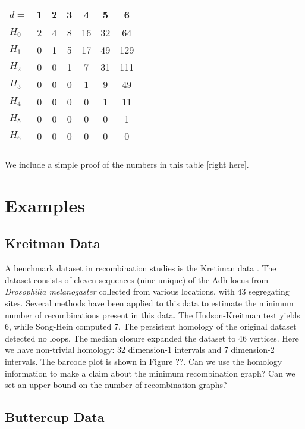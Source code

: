 \begin{center}
\begin{tabular}{lcccccc}
$d=$    & 1 & 2 & 3 &  4 &  5 & 6\\
\toprule
$H_{0}$ & 2 & 4 & 8 & 16 & 32 & 64\\
\midrule
$H_{1}$ & 0 & 1 & 5 & 17 & 49 & 129\\
\midrule
$H_{2}$ & 0 & 0 & 1 &  7 & 31 & 111\\
\midrule
$H_{3}$ & 0 & 0 & 0 &  1 &  9 & 49\\
\midrule
$H_{4}$ & 0 & 0 & 0 & 0 &  1 & 11\\
\midrule
$H_{5}$ & 0 & 0 & 0 & 0 &  0 &  1\\
\midrule
$H_{6}$ & 0 & 0 & 0 & 0 & 0 &  0\\
\bottomrule
\label{fig:hypercube_homology}
\end{tabular}
\end{center}

We include a simple proof of the numbers in this table [right here].

\section{Examples}

\subsection{Kreitman Data}

A benchmark dataset in recombination studies is the Kretiman data \citep{Kreitman:1983}.
The dataset consists of eleven sequences (nine unique) of the Adh locus from \emph{Drosophilia melanogaster} collected from various locations, with 43 segregating sites.
Several methods have been applied to this data to estimate the minimum number of recombinations present in this data.
The Hudson-Kreitman test yields 6, while Song-Hein computed 7.
The persistent homology of the original dataset detected no loops.
The median closure expanded the dataset to 46 vertices.
Here we have non-trivial homology: 32 dimension-1 intervals and 7 dimension-2 intervals.
The barcode plot is shown in Figure ??.
Can we use the homology information to make a claim about the minimum recombination graph?
Can we set an upper bound on the number of recombination graphs?

\subsection{Buttercup Data}

